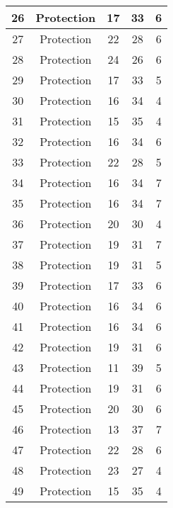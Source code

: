 \documentclass[results.tex]{subfiles}
\begin{document}
\begin{center}
\begin{tabular}{| c || c | c | c | c |}
    \hline
    26 & Protection & 17 & 33 & 6 \\ 
    \hline
    27 & Protection & 22 & 28 & 6 \\ 
    \hline
    28 & Protection & 24 & 26 & 6 \\ 
    \hline
    29 & Protection & 17 & 33 & 5 \\ 
    \hline
    30 & Protection & 16 & 34 & 4 \\ 
    \hline
    31 & Protection & 15 & 35 & 4 \\ 
    \hline
    32 & Protection & 16 & 34 & 6 \\ 
    \hline
    33 & Protection & 22 & 28 & 5 \\ 
    \hline
    34 & Protection & 16 & 34 & 7 \\ 
    \hline
    35 & Protection & 16 & 34 & 7 \\ 
    \hline
    36 & Protection & 20 & 30 & 4 \\ 
    \hline
    37 & Protection & 19 & 31 & 7 \\ 
    \hline
    38 & Protection & 19 & 31 & 5 \\ 
    \hline
    39 & Protection & 17 & 33 & 6 \\ 
    \hline
    40 & Protection & 16 & 34 & 6 \\ 
    \hline
    41 & Protection & 16 & 34 & 6 \\ 
    \hline
    42 & Protection & 19 & 31 & 6 \\ 
    \hline
    43 & Protection & 11 & 39 & 5 \\ 
    \hline
    44 & Protection & 19 & 31 & 6 \\ 
    \hline
    45 & Protection & 20 & 30 & 6 \\ 
    \hline
    46 & Protection & 13 & 37 & 7 \\ 
    \hline
    47 & Protection & 22 & 28 & 6 \\ 
    \hline
    48 & Protection & 23 & 27 & 4 \\ 
    \hline
    49 & Protection & 15 & 35 & 4 \\ 
    \hline   \end{tabular}
\end{center}
\end{document}

